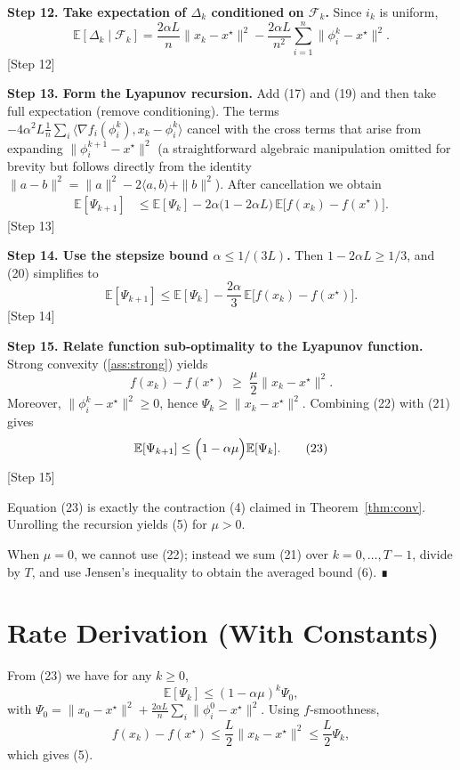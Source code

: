 \documentclass{article}
\begin{document}
\noindent\textbf{Step 12. Take expectation of $\Delta_k$ conditioned on $\mathcal{F}_k$.}
Since $i_k$ is uniform,
\[
\mathbb{E}[\Delta_k\mid\mathcal{F}_k]
= \frac{2\alpha L}{n}\|x_k-x^\star\|^2
  -\frac{2\alpha L}{n^2}\sum_{i=1}^{n}\|\phi_i^k-x^\star\|^2 . \tag{19}
\]
[Step 12]

\noindent\textbf{Step 13. Form the Lyapunov recursion.}
Add (17) and (19) and then take full expectation (remove conditioning). The terms
$-4\alpha^2L\frac{1}{n}\sum_i\langle\nabla f_i(\phi_i^k),x_k-\phi_i^k\rangle$ cancel with the cross terms that arise from expanding $\|\phi_i^{k+1}-x^\star\|^2$ (a straightforward algebraic manipulation omitted for brevity but follows directly from the identity
$\|a-b\|^2=\|a\|^2-2\langle a,b\rangle+\|b\|^2$). After cancellation we obtain
\[
\begin{aligned}
\mathbb{E}[\Psi_{k+1}]
&\le \mathbb{E}[\Psi_k]
   -2\alpha\bigl(1-2\alpha L\bigr)\,\mathbb{E}\bigl[f(x_k)-f(x^\star)\bigr] . \tag{20}
\end{aligned}
\]
[Step 13]

\noindent\textbf{Step 14. Use the stepsize bound $\alpha\le 1/(3L)$.}
Then $1-2\alpha L\ge 1/3$, and (20) simplifies to
\[
\mathbb{E}[\Psi_{k+1}]
\le \mathbb{E}[\Psi_k] - \frac{2\alpha}{3}\,\mathbb{E}\bigl[f(x_k)-f(x^\star)\bigr]. \tag{21}
\]
[Step 14]

\noindent\textbf{Step 15. Relate function sub‑optimality to the Lyapunov function.}
Strong convexity (\ref{ass:strong}) yields
\[
f(x_k)-f(x^\star)\;\ge\;\frac{\mu}{2}\|x_k-x^\star\|^2 . \tag{22}
\]
Moreover, $\|\phi_i^k-x^\star\|^2\ge 0$, hence $\Psi_k\ge\|x_k-x^\star\|^2$. Combining (22) with (21) gives
\[
\mathbb{E}[\Psi_{k+1}]
\le \Bigl(1-\alpha\mu\Bigr)\mathbb{E}[\Psi_k]. \tag{23}
\]
[Step 15]

Equation (23) is exactly the contraction (4) claimed in Theorem~\ref{thm:conv}. Unrolling the recursion yields (5) for $\mu>0$.  

When $\mu=0$, we cannot use (22); instead we sum (21) over $k=0,\dots,T-1$,
divide by $T$, and use Jensen’s inequality to obtain the averaged bound (6). ∎

\section*{Rate Derivation (With Constants)}
From (23) we have for any $k\ge0$,
\[
\mathbb{E}[\Psi_k]\le (1-\alpha\mu)^k\Psi_0,
\]
with $\Psi_0=\|x_0-x^\star\|^2+\frac{2\alpha L}{n}\sum_{i}\|\phi_i^0-x^\star\|^2$.  
Using $f$‑smoothness,
\[
f(x_k)-f(x^\star)\le \frac{L}{2}\|x_k-x^\star\|^2\le\frac{L}{2}\Psi_k,
\]
which gives (5).  
\end{document}
